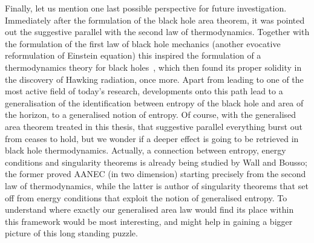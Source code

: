 Finally, let us mention one last possible perspective for future investigation. Immediately after the formulation of the black hole area theorem, it was pointed out the suggestive parallel with the second law of thermodynamics. Together with the formulation of the first law of black hole mechanics (another evocative reformulation of Einstein equation) this inspired the formulation of a thermodynamics theory for black holes~\cite[]{bardeen1973four}, which then found its proper solidity in the discovery of Hawking radiation, once more.
Apart from leading to one of the most active field of today's research, developments onto this path lead to a generalisation of the identification between entropy of the black hole and area of the horizon, to a generalised notion of entropy.
Of course, with the generalised area theorem treated in this thesis, that suggestive parallel everything burst out from ceases to hold, but we wonder if a deeper effect is going to be retrieved in black hole thermodynamics. 
Actually, a connection between entropy, energy conditions and singularity theorems is already being studied by Wall and Bousso; the former proved AANEC (in two dimension) starting precisely from the second law of thermodynamics, while the latter is author of singularity theorems that set off from energy conditions that exploit the notion of generalised entropy. To understand where exactly our generalised area law would find its place within this framework would be most interesting, and might help in gaining a bigger picture of this long standing puzzle.
